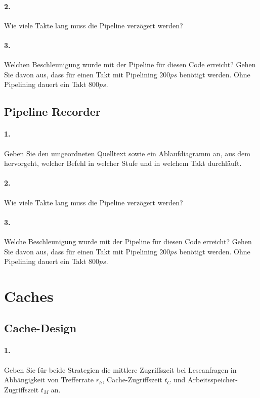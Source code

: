 \documentclass[paper=a4, fontsize=11pt]{scrartcl}
\numberwithin{equation}{section}
\numberwithin{figure}{section}
\numberwithin{table}{section}
\begin{document}
\paragraph{2.}
Wie viele Takte lang muss die Pipeline verzögert werden?

\paragraph{3.}
Welchen Beschleunigung wurde mit der Pipeline für diesen Code erreicht? Gehen Sie davon aus, dass für einen Takt mit Pipelining $200 ps$ benötigt werden. Ohne Pipelining dauert ein Takt $800 ps$.

\subsection{Pipeline Recorder}

\paragraph{1.}
Geben Sie den umgeordneten Quelltext sowie ein Ablaufdiagramm an, aus dem hervorgeht, welcher Befehl in welcher Stufe und in welchem Takt durchläuft.

\paragraph{2.}
Wie viele Takte lang muss die Pipeline verzögert werden?

\paragraph{3.}
Welche Beschleunigung wurde mit der Pipeline für diesen Code erreicht? Gehen Sie davon aus, dass für einen Takt mit Pipelining $200 ps$ benötigt werden. Ohne Pipelining dauert ein Takt $800 ps$.

\section{Caches}
\subsection{Cache-Design}

\paragraph{1.}
Geben Sie für beide Strategien die mittlere Zugriffszeit bei Leseanfragen in Abhängigkeit von Trefferrate $r_{h}$, Cache-Zugriffszeit $t_{C}$ und Arbeitsspeicher-Zugriffszeit $t_{M}$ an.
\end{document}
